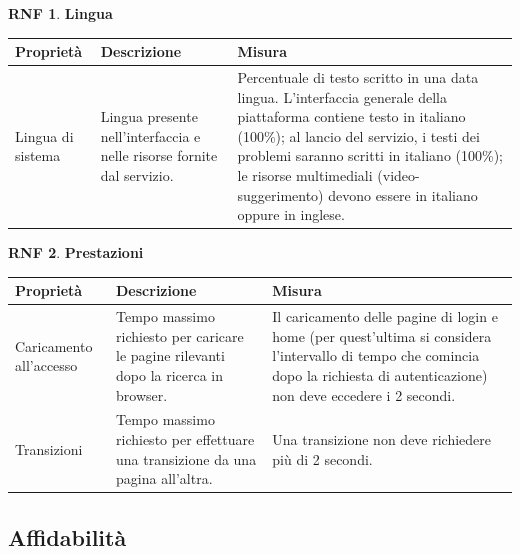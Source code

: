 \documentclass[11pt, a4paper]{article}
\theoremstyle{definition} %
\newtheorem{nonfuncreq}{RNF} %
\begin{document}
\begin{nonfuncreq}
    \textbf{Lingua }
    \begin{center}
        \footnotesize
        \begin{tabularx}{\textwidth}{|X||X||X|}
            \hline
            \cellcolor{red!70}Proprietà & \cellcolor{red!70}Descrizione & \cellcolor{red!70}Misura\\
            \hline
            Lingua di sistema           & Lingua presente nell'interfaccia e nelle risorse fornite dal servizio. & Percentuale di testo scritto in una data lingua. L'interfaccia generale della piattaforma contiene testo in italiano (100\%); al lancio del servizio, i testi dei problemi saranno scritti in italiano (100\%); le risorse multimediali (video-suggerimento) devono essere in italiano oppure in inglese.\\
            \hline
        \end{tabularx}
    \end{center}
\end{nonfuncreq}

\begin{nonfuncreq}
    \textbf{Prestazioni }
    \begin{center}
        \footnotesize
        \begin{tabularx}{\textwidth}{|X||X||X|}
            \hline
            \cellcolor{red!70}Proprietà & \cellcolor{red!70}Descrizione & \cellcolor{red!70}Misura\\
            \hline
            Caricamento all'accesso & Tempo massimo richiesto per caricare le pagine rilevanti dopo la ricerca in browser. & Il caricamento delle pagine di login e home (per quest'ultima si considera l'intervallo di tempo che comincia dopo la richiesta di autenticazione) non deve eccedere i 2 secondi.\\
            \hline
            Transizioni & Tempo massimo richiesto per effettuare una transizione da una pagina all'altra.  & Una transizione non deve richiedere più di 2 secondi.\\
            \hline
        \end{tabularx}
    \end{center}
\end{nonfuncreq}

\subsection{Affidabilità}
\end{document}
